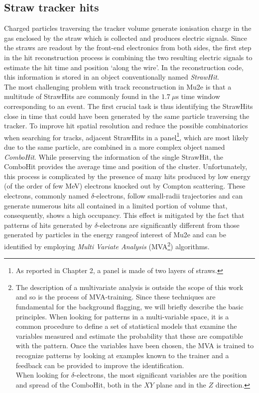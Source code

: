 \documentclass[12pt,a4paper,openright, oneside, titlepage]{book} %
\begin{document}
\subsection{Straw tracker hits}
Charged particles traversing the tracker volume generate ionisation charge in the gas enclosed by the straw which is collected and produces electric signals.
Since the straws are readout by the front-end electronics from both sides, 
the first step in the hit reconstruction process is combining the two resulting electric signals 
to estimate the hit time and position `along the wire'. 
In the reconstruction code, this information is stored in an object conventionally named \textit{StrawHit}.\\
The most challenging problem with track reconstruction in Mu2e 
is that a multitude of StrawHits are commonly found
in the  $1.7\ \mu$s time window corresponding to an event.
The first crucial task is thus identifying the StrawHits close in time that could have been generated by the same particle traversing the tracker.
To improve hit spatial resolution and reduce the possible combinatorics when searching for tracks, 
adjacent StrawHits in a panel\footnote{As reported in Chapter 2, a panel is made of two layers of straws.}, 
which are most likely due to the same particle, 
are combined in a more complex object named \textit{ComboHit}. 
While preserving the information of the single StrawHit, the ComboHit provides the average time and position of the cluster. 
Unfortunately, this process is complicated by the presence of many hits produced by low energy (of the order of few MeV) electrons knocked out by Compton scattering. 
These electrons, commonly named $\delta$-electrons, follow small-radii trajectories and can generate numerous hits all contained in a limited portion of volume that, consequently, shows a high occupancy. 
This effect is mitigated by the fact that patterns of hits generated by $\delta$-electrons are significantly different from those generated by particles in the energy rangeof interest of Mu2e and can be identified by employing \textit{Multi Variate Analysis} 
(MVA\footnote{The description of a multivariate analysis is outside the scope of this work and so is the process of MVA-training. Since these techniques are fundamental for the background flagging, we will briefly describe the basic principles.
When looking for patterns in a multi-variable space, it is a common procedure to define a set of statistical models that examine the variables measured and estimate the probability that these are compatible with the pattern. 
Once the variables have been chosen, the MVA is trained to recognize patterns by looking at examples known to the trainer and a feedback can be provided to improve the identification.\\
When looking for $\delta$-electrons, the most significant variables are the position and spread of the ComboHit, both in the $XY$ plane and in the $Z$ direction.}) algorithms.\\
\end{document}
